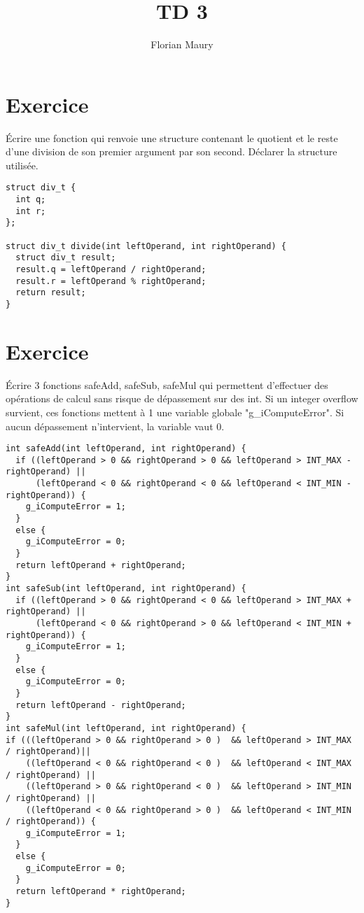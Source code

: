 \documentclass[10pt]{article}
\title{TD 3}
\author{Florian Maury}
\begin{document}
\section{Exercice}
\'Ecrire une fonction qui renvoie une structure contenant le quotient et le reste d'une division de son premier argument par son second. Déclarer la structure utilisée.

\begin{verbatim}
struct div_t {
  int q;
  int r;
};

struct div_t divide(int leftOperand, int rightOperand) {
  struct div_t result;
  result.q = leftOperand / rightOperand;
  result.r = leftOperand % rightOperand;
  return result;
}
\end{verbatim}

\section{Exercice}
\'Ecrire 3 fonctions safeAdd, safeSub, safeMul qui permettent d'effectuer des opérations de calcul sans risque de dépassement sur des int. 
Si un integer overflow survient, ces fonctions mettent à 1 une variable globale "g\_iComputeError". 
Si aucun dépassement n'intervient, la variable vaut 0.

\begin{verbatim}
int safeAdd(int leftOperand, int rightOperand) {
  if ((leftOperand > 0 && rightOperand > 0 && leftOperand > INT_MAX - rightOperand) ||
      (leftOperand < 0 && rightOperand < 0 && leftOperand < INT_MIN - rightOperand)) {
    g_iComputeError = 1;
  }
  else {
    g_iComputeError = 0;  
  }
  return leftOperand + rightOperand;
}
int safeSub(int leftOperand, int rightOperand) {
  if ((leftOperand > 0 && rightOperand < 0 && leftOperand > INT_MAX + rightOperand) || 
      (leftOperand < 0 && rightOperand > 0 && leftOperand < INT_MIN + rightOperand)) {
    g_iComputeError = 1;
  }
  else {
    g_iComputeError = 0;  
  }
  return leftOperand - rightOperand;
}
int safeMul(int leftOperand, int rightOperand) {
if (((leftOperand > 0 && rightOperand > 0 )  && leftOperand > INT_MAX / rightOperand)||
    ((leftOperand < 0 && rightOperand < 0 )  && leftOperand < INT_MAX / rightOperand) ||
    ((leftOperand > 0 && rightOperand < 0 )  && leftOperand > INT_MIN / rightOperand) ||
    ((leftOperand < 0 && rightOperand > 0 )  && leftOperand < INT_MIN / rightOperand)) {
    g_iComputeError = 1;
  }
  else {
    g_iComputeError = 0;  
  }
  return leftOperand * rightOperand;
}
\end{verbatim}
\end{document}
